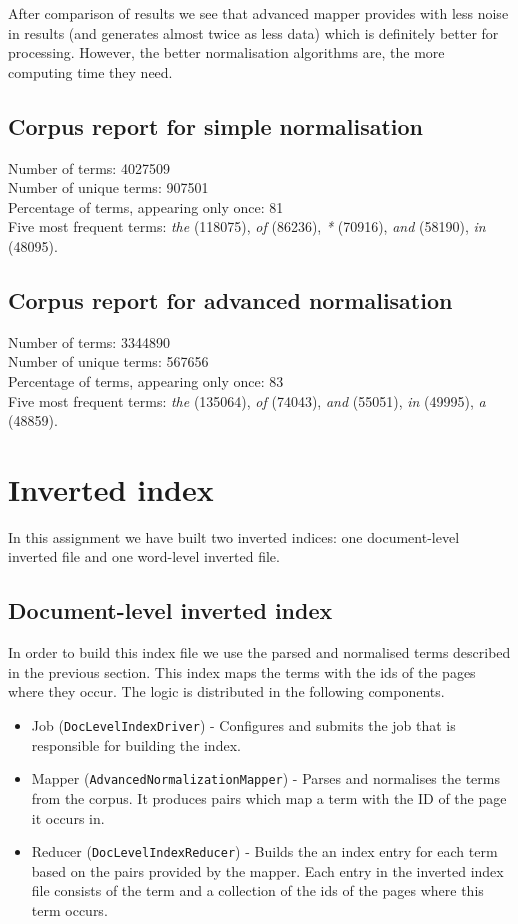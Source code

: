 \documentclass[a4paper, notitlepage]{report}
\begin{document}
After comparison of results we see that advanced mapper provides with less noise in results (and generates almost twice as less data) which is definitely better for processing. However, the better normalisation algorithms are, the more computing time they need.  

\subsection{Corpus report for simple normalisation}

Number of terms: 4027509\\
Number of unique terms: 907501\\
Percentage of terms, appearing only once: 81\\
Five most frequent terms: \emph{the} (118075), \emph{of} (86236), \emph{*} (70916), \emph{and} (58190), \emph{in} (48095).


\subsection{Corpus report for advanced normalisation}

Number of terms: 3344890\\
Number of unique terms: 567656\\
Percentage of terms, appearing only once: 83\\
Five most frequent terms: \emph{the} (135064), \emph{of} (74043), \emph{and} (55051), \emph{in} (49995), \emph{a} (48859).

\section{Inverted index}
In this assignment we have built two inverted indices: one document-level inverted file and one word-level inverted file.

\subsection{Document-level inverted index}
In order to build this index file we use the parsed and normalised terms described in the previous section. This index maps the terms with the ids of the pages where they occur. The logic is distributed in the following components.

\begin{itemize}
	\item Job (\lstinline{DocLevelIndexDriver}) - Configures and submits the job that is responsible for building the index.
	\item Mapper (\lstinline{AdvancedNormalizationMapper}) - Parses and normalises the terms from the corpus. It produces pairs which map a term with the ID of the page it occurs in.
	\item Reducer (\lstinline{DocLevelIndexReducer}) - Builds the an index entry for each term based on the pairs provided by the mapper. Each entry in the inverted index file consists of the term and a collection of the ids of the pages where this term occurs.  
\end{itemize}
\end{document}
